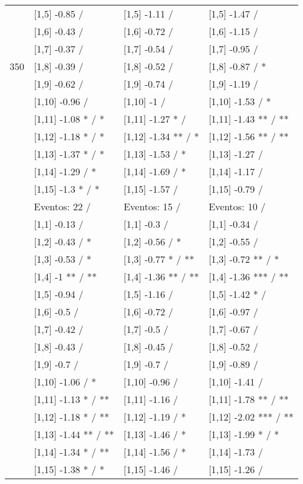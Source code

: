 \begin{table}
\begin{tabular}[t]{llll}
 & {}[1,5] -0.85  / & {}[1,5] -1.11  / & {}[1,5] -1.47  /\\
 & {}[1,6] -0.43  / & {}[1,6] -0.72  / & {}[1,6] -1.15  /\\
 & {}[1,7] -0.37  / & {}[1,7] -0.54  / & {}[1,7] -0.95  /\\
350 & {}[1,8] -0.39  / & {}[1,8] -0.52  / & {}[1,8] -0.87  / *\\
\addlinespace
 & {}[1,9] -0.62  / & {}[1,9] -0.74  / & {}[1,9] -1.19  /\\
 & {}[1,10] -0.96  / & {}[1,10] -1  / & {}[1,10] -1.53  / *\\
 & {}[1,11] -1.08 * / * & {}[1,11] -1.27 * / & {}[1,11] -1.43 ** / **\\
 & {}[1,12] -1.18 * / * & {}[1,12] -1.34 ** / * & {}[1,12] -1.56 ** / **\\
 & {}[1,13] -1.37 * / * & {}[1,13] -1.53  / * & {}[1,13] -1.27  /\\
\addlinespace
 & {}[1,14] -1.29  / * & {}[1,14] -1.69  / * & {}[1,14] -1.17  /\\
 & {}[1,15] -1.3 * / * & {}[1,15] -1.57  / & {}[1,15] -0.79  /\\
 & Eventos:  22 / & Eventos:  15 / & Eventos:  10 /\\
 & {}[1,1] -0.13  / & {}[1,1] -0.3  / & {}[1,1] -0.34  /\\
 & {}[1,2] -0.43  / * & {}[1,2] -0.56  / * & {}[1,2] -0.55  /\\
\addlinespace
 & {}[1,3] -0.53  / * & {}[1,3] -0.77 * / ** & {}[1,3] -0.72 ** / *\\
 & {}[1,4] -1 ** / ** & {}[1,4] -1.36 ** / ** & {}[1,4] -1.36 *** / **\\
 & {}[1,5] -0.94  / & {}[1,5] -1.16  / & {}[1,5] -1.42 * /\\
 & {}[1,6] -0.5  / & {}[1,6] -0.72  / & {}[1,6] -0.97  /\\
 & {}[1,7] -0.42  / & {}[1,7] -0.5  / & {}[1,7] -0.67  /\\
\addlinespace
500 & {}[1,8] -0.43  / & {}[1,8] -0.45  / & {}[1,8] -0.52  /\\
 & {}[1,9] -0.7  / & {}[1,9] -0.7  / & {}[1,9] -0.89  /\\
 & {}[1,10] -1.06  / * & {}[1,10] -0.96  / & {}[1,10] -1.41  /\\
 & {}[1,11] -1.13 * / ** & {}[1,11] -1.16  / & {}[1,11] -1.78 ** / **\\
 & {}[1,12] -1.18 * / ** & {}[1,12] -1.19  / * & {}[1,12] -2.02 *** / **\\
\addlinespace
 & {}[1,13] -1.44 ** / ** & {}[1,13] -1.46  / * & {}[1,13] -1.99 * / *\\
 & {}[1,14] -1.34 * / ** & {}[1,14] -1.56  / * & {}[1,14] -1.73  /\\
 & {}[1,15] -1.38 * / * & {}[1,15] -1.46  / & {}[1,15] -1.26  /\\
\bottomrule
\end{tabular}
\end{table}
